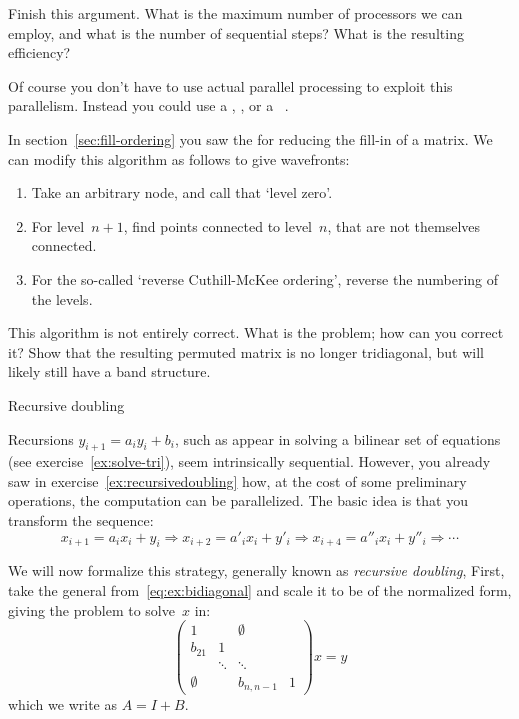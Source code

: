 \begin{exercise}
  Finish this argument. What is the maximum number of processors we
  can employ, and what is the number of sequential steps? What is the
  resulting efficiency?
\end{exercise}

Of course you don't have to use actual parallel processing
to exploit this parallelism. Instead you could use a
, ,
or a ~\cite{Liu:cudasw2009}.

In section~\ref{sec:fill-ordering} you saw the
 for reducing the fill-in of a
matrix. We can modify this algorithm as follows to give wavefronts:
\begin{enumerate}
\item Take an arbitrary node, and call that `level zero'.
\item For level~$n+1$, find points connected to
  level~$n$, that are not themselves connected.
\item For the so-called `reverse Cuthill-McKee ordering', reverse the
  numbering of the levels.
\end{enumerate}
\begin{exercise}
  This algorithm is not entirely correct. What is the problem; how can
  you correct it? Show that the resulting permuted matrix is no
  longer tridiagonal, but will likely still have a band structure.
\end{exercise}

 {Recursive doubling}
\label{sec:recdouble}

Recursions $y_{i+1} = a_i  y_i + b_i $,
such as appear in solving a bilinear set of equations
(see exercise~\ref{ex:solve-tri}),
seem intrinsically sequential.
However, you  already saw in
exercise~\ref{ex:recursivedoubling} how, at the cost of some preliminary
operations, the computation can be parallelized.
The basic idea is that you transform the sequence:
\[ x_{i+1} = a_i x_i+y_i \Rightarrow x_{i+2} = a'_i x_i + y'_i
\Rightarrow x_{i+4} = a''_ix_i + y''_i \Rightarrow \cdots \]

We will now formalize this strategy, generally known as
\emph{recursive doubling},  First, take the general
from~\eqref{eq:ex:bidiagonal} and scale it to be of the normalized form,
giving the problem to solve~$x$ in:
\[ 
  \begin{pmatrix}
    1&&\emptyset\\ b_{21}&1\\ &\ddots&\ddots\\ 
    \emptyset&&b_{n,n-1}&1
  \end{pmatrix} x = y
\]
which we write as $A=I+B$.

